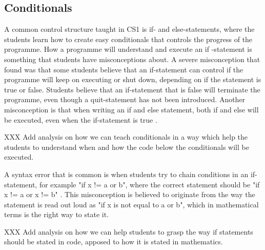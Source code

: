 \subsection{Conditionals}

A common control structure taught in CS1 is if- and else-statements, where 
the students learn how to create easy conditionals that controls the 
progress of the programme. How a programme will understand and execute an if
-statement is something that students have misconceptions about. A severe 
misconception that \textcite{Plass2015Variables} found was that some 
students believe that an if-statement can control if the programme will 
keep on executing or shut down, depending on if the statement is true or 
false. Students believe that an if-statement that is false will terminate 
the programme, even though a quit-statement has not been introduced. 
Another misconception is that when writing an if and else statement, both 
if and else will be executed, even when the if-statement is true \parencite{
MisconceptionsSurvey2017}.

XXX Add analysis on how we can teach conditionals in a way which help the 
students to understand when and how the code below the conditionals will be 
executed.

A syntax error that is common is when students try to chain conditions in 
an if-statement, for example "if x != a or b", where the correct statement 
should be "if x != a or x != b" \parencite{GuoMarkelZhang2020}. This 
misconception is believed to originate from the way the statement is read 
out loud as "if x is not equal to a or b", which in mathematical terms is 
the right way to state it. 

XXX Add analysis on how we can help students to grasp the way if statements 
should be stated in code, apposed to how it is stated in mathematics. 